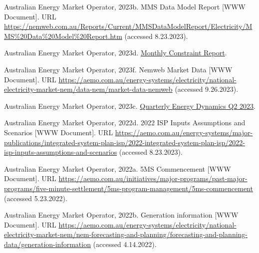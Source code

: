 \documentclass[12pt,a4paper,]{report}
\newlength{\cslhangindent}
\newenvironment{CSLReferences}[2] %
 {%
  \setlength{\parindent}{0pt}
  \ifodd #1 \everypar{\setlength{\hangindent}{\cslhangindent}}\ignorespaces\fi
  \ifnum #2 > 0
  \setlength{\parskip}{#2\baselineskip}
  \fi
 }%
 {}
\begin{document}
\begin{CSLReferences}{1}{0}
\leavevmode{}%
Australian Energy Market Operator, 2023b. {MMS Data Model Report} {[}WWW
Document{]}. URL
\url{https://nemweb.com.au/Reports/Current/MMSDataModelReport/Electricity/MMS\%20Data\%20Model\%20Report.htm}
(accessed 8.23.2023).

\leavevmode{}%
Australian Energy Market Operator, 2023d.
\href{https://aemo.com.au/-/media/files/electricity/nem/security_and_reliability/congestion-information/statistics/2023/monthly-constraint-report-july-2023.pdf?la=en}{Monthly
{Constraint Report}}.

\leavevmode{}%
Australian Energy Market Operator, 2023f. Nemweb {Market Data} {[}WWW
Document{]}. URL
\url{https://aemo.com.au/energy-systems/electricity/national-electricity-market-nem/data-nem/market-data-nemweb}
(accessed 9.26.2023).

\leavevmode{}%
Australian Energy Market Operator, 2023c.
\href{https://aemo.com.au/-/media/files/major-publications/qed/2023/qed-q2-2023-report.pdf?la=en&hash=719538BE6166CB79BE1BF6B9BE82A183}{Quarterly
{Energy Dynamics Q2} 2023}.

\leavevmode{}%
Australian Energy Market Operator, 2022d. 2022 {ISP Inputs Assumptions}
and {Scenarios} {[}WWW Document{]}. URL
\url{https://aemo.com.au/energy-systems/major-publications/integrated-system-plan-isp/2022-integrated-system-plan-isp/2022-isp-inputs-assumptions-and-scenarios}
(accessed 8.23.2023).

\leavevmode{}%
Australian Energy Market Operator, 2022a. {5MS Commencement} {[}WWW
Document{]}. URL
\url{https://aemo.com.au/initiatives/major-programs/past-major-programs/five-minute-settlement/5ms-program-management/5ms-commencement}
(accessed 5.23.2022).

\leavevmode{}%
Australian Energy Market Operator, 2022b. Generation information {[}WWW
Document{]}. URL
\url{https://aemo.com.au/energy-systems/electricity/national-electricity-market-nem/nem-forecasting-and-planning/forecasting-and-planning-data/generation-information}
(accessed 4.14.2022).


\end{CSLReferences}
\end{document}
